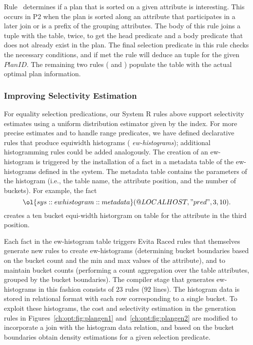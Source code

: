 Rule~ determines if a plan that is sorted on a given attribute is
interesting.  This occurs in P2 when the plan is sorted along an attribute that
participates in a later join or is a prefix of the grouping attributes.  The
body of this rule joins a  tuple with the  table, twice,
to get the head predicate and a body predicate that does not already exist in
the plan.  The final selection predicate in this rule checks the necessary
conditions, and if met the rule will deduce an  tuple for
the given $PlanID$.  The remaining two rules ( and ) populate
the  table with the actual optimal plan information.

\subsubsection{Improving Selectivity Estimation}

For equality selection predications, our System R rules above support
selectivity estimates using a uniform distribution estimator given by the
index.  For more precise estimates and to handle range predicates, we have
defined declarative rules that produce equiwidth histograms ({\em
ew-histograms}); additional histogramming rules could be added analogously.
The creation of an ew-histogram is triggered by the installation of a fact in a
metadata table of the ew-histograms defined in the system.  The metadata table
contains the parameters of the histogram (i.e., the table name, the attribute
position, and the number of buckets).  For example, the fact \[
\ol{sys::ewhistogram::metadata}(@LOCALHOST, "pred", 3, 10).  \] creates a ten
bucket equi-width historgram on table  for the attribute in the third
position.

Each fact in the ew-histogram table triggers Evita Raced rules that themselves
generate new rules to create ew-histograms (determining bucket boundaries based
on the bucket count and the min and max values of the attribute), and to
maintain bucket counts (performing a count aggregation over the table
attributes, grouped by the bucket boundaries).  The compiler stage that
generates ew-histograms in this fashion consists of $23$ rules ($92$ lines).
The histogram data is stored in relational format with each row corresponding
to a single bucket.  To exploit these histograms, the cost and selectivity
estimation in the  generation rules in
Figures~\ref{ch:opt:fig:plangen1} and~\ref{ch:opt:fig:plangen2} are modified to
incorporate a join with the histogram data relation, and based on the bucket
boundaries obtain density estimations for a given selection predicate.


